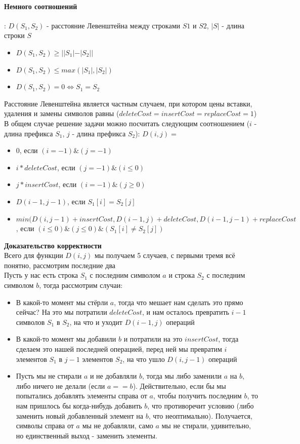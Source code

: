 \documentclass[a4paper,10pt]{article}
\begin{document}
\paragraph{Немного соотношений}: $D(S_1, S_2)$ - расстояние Левенштейна между строками $S1$ и $S2$, $|S|$ - длина строки $S$ \\
\begin{itemize}
	\item $D(S_1, S_2) \geq ||S_1| - |S_2||$
	\item $D(S_1, S_2) \leq max(|S_1|, |S_2|)$
	\item $D(S_1, S_2) = 0 \Leftrightarrow S_1 = S_2$
\end{itemize}
Расстояние Левенштейна является частным случаем, при котором цены вставки, удаления и замены символов равны ($deleteCost = insertCost = replaceCost = 1$) \\
В общем случае решение задачи можно посчитать следующим соотношением ($i$ - длина префикса $S_1$, $j$ - длина префикса $S_2$): $D(i, j) = $
\begin{itemize}
	\item $0$, если $(i = -1) \& (j = -1)$
	\item $i*deleteCost$, если $(j = -1) \& (i \leq 0)$
	\item $j*insertCost$, если $(i = -1) \& (j \geq 0)$
	\item $D(i - 1, j - 1)$, если $S_1[i] = S_2[j]$
	\item $min(D(i, j -1) + insertCost, D(i - 1, j) + deleteCost, D(i - 1, j - 1) + replaceCost$, если $(i \leq 0) \& (j \leq 0) \& (S_1[i] \neq S_2[j])$
\end{itemize} 
\textbf{Доказательство корректности}\\
Всего для функции $D(i,j)$ мы получаем 5 случаев, с первыми тремя всё понятно, рассмотрим последние два \\
Пусть у нас есть строка $S_1$ с последним символом $a$ и строка $S_2$ с последним символом $b$, тогда рассмотрим случаи:
\begin{itemize}
	\item В какой-то момент мы стёрли $a$, тогда что мешает нам сделать это прямо сейчас? На это мы потратили $deleteCost$, и нам осталось превратить $i-1$ символов $S_1$ в $S_2$, на что и уходит $D(i - 1, j)$ операций
	\item В какой-то момент мы добавили $b$ и потратили на это $insertCost$, тогда сделаем это нашей последней операцией, перед ней мы превратим $i$ элементов $S_1$ в $j - 1$ элементов $S_2$, на что ушло $D(i, j - 1)$ операций
	\item Пусть мы не стирали $a$ и не добавляли $b$, тогда мы либо заменили $a$ на $b$, либо ничего не делали (если $a == b$). Действительно, если бы мы попытались добавлять элементы справа от $a$, чтобы получить последним $b$, то нам пришлось бы когда-нибудь добавить $b$, что противоречит условию (либо заменить новый добавленный элемент на $b$, что неоптимально). Получается, символы справа от $a$ мы не добавляли, само $a$ мы не стирали, удивительно, но единственный выход - заменить элементы.
\end{itemize}
\end{document}
